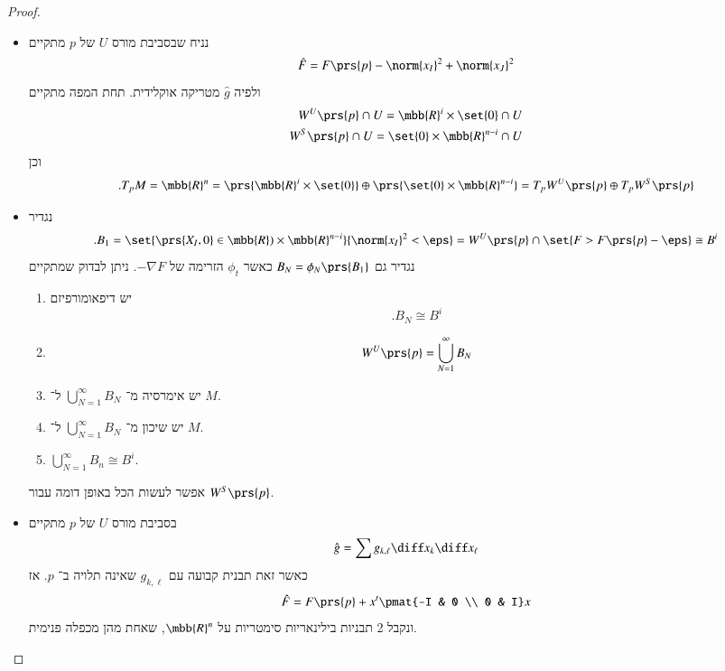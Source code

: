 \documentclass[a4paper,10pt,twoside,openany]{book}
\begin{document}
\begin{proof}
\begin{itemize}
\item
נניח שבסביבת מורס
$U$
של
$p$
מתקיים
\[\hat{F} = F\prs{p} - \norm{x_I}^2 + \norm{x_J}^2\]
ולפיה
$\hat{g}$
מטריקה אוקלידית.
תחת המפה מתקיים
\begin{align*}
W^U\prs{p} \cap U = \mbb{R}^i \times \set{0} \cap U \\
W^S\prs{p} \cap U = \set{0} \times \mbb{R}^{n-i} \cap U
\end{align*}
וכן
\[\text{.} T_p M = \mbb{R}^n = \prs{\mbb{R}^i \times \set{0}} \oplus \prs{\set{0} \times \mbb{R}^{n-i}} = T_p W^U\prs{p} \oplus T_p W^S\prs{p}\]
\item נגדיר
\[\text{.} B_1 = \set{\prs{X_I, 0} \in \mbb{R}^^i \times \mbb{R}^{n-i}}{\norm{x_I}^2 < \eps} = W^U\prs{p} \cap \set{F > F\prs{p} - \eps} \cong B^i\]
נגדיר גם
$B_N = \phi_N\prs{B_1}$
כאשר
$\phi_t$
הזרימה של
$-\nabla F$.
ניתן לבדוק שמתקיים
\begin{enumerate}[label = (\roman*)]
\item יש דיפאומורפיזם
\[\text{.} B_N \cong B^i\]
\item \[W^U\prs{p} = \bigcup_{N = 1}^{\infty} B_N\]
\item יש אימרסיה מ־%
$\bigcup_{N=1}^{\infty} B_N$
ל־%
$M$.
\item יש שיכון מ־%
$\bigcup_{N = 1}^{\infty} B_N$
ל־%
$M$.
\item $\bigcup_{N=1}^{\infty} B_n \cong B^i$.
\end{enumerate}

אפשר לעשות הכל באופן דומה עבור
$W^S\prs{p}$.

\item
בסביבת מורס
$U$
של
$p$
מתקיים
\[\hat{g} = \sum g_{k,\ell} \diff x_k \diff x_\ell\]
כאשר זאת תבנית קבועה עם
$g_{k,\ell}$
שאינה תלויה ב־%
$p$.
אז
\[\hat{F} = F\prs{p} + x^t \pmat{-I & 0 \\ 0 & I} x\]
ונקבל 2 תבניות בילינאריות סימטריות על
$\mbb{R}^n$,
שאחת מהן מכפלה פנימית.


\end{itemize}
\end{proof}
\end{document}
